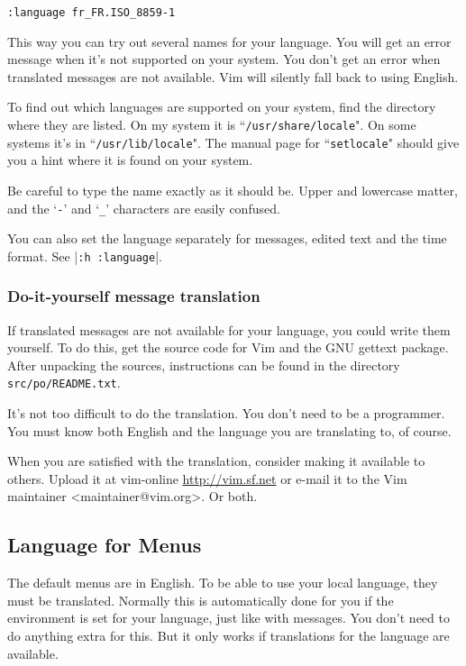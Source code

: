 \begin{Verbatim}[samepage=true]
 :language fr_FR.ISO_8859-1
\end{Verbatim}

This way you can try out several names for your language.
You will get an error message when it's not supported on your system.
You don't get an error when translated messages are not available.
Vim will silently fall back to using English.

To find out which languages are supported on your system, find the directory where they are listed.
On my system it is ``\texttt{/usr/share/locale}".
On some systems it's in ``\texttt{/usr/lib/locale}".
The manual page for ``\texttt{setlocale}" should give you a hint where it is found on your system.

Be careful to type the name exactly as it should be.
Upper and lowercase matter, and the `\texttt{-}' and `\texttt{\_}' characters are easily confused.

You can also set the language separately for messages, edited text and the time format.
See |\texttt{:h :language}|.

\subsubsection{Do-it-yourself message translation}
If translated messages are not available for your language, you could write them yourself.
To do this, get the source code for Vim and the GNU gettext package.
After unpacking the sources, instructions can be found in the directory \texttt{src/po/README.txt}.

It's not too difficult to do the translation.
You don't need to be a programmer.
You must know both English and the language you are translating to, of course.

When you are satisfied with the translation, consider making it available to others.
Upload it at vim-online \url{http://vim.sf.net} or e-mail it to the Vim maintainer <maintainer@vim.org>. Or both.
\subsection{Language for Menus}
The default menus are in English.
To be able to use your local language, they must be translated.
Normally this is automatically done for you if the environment is set for your language, just like with messages.
You don't need to do anything extra for this.
But it only works if translations for the language are available.

